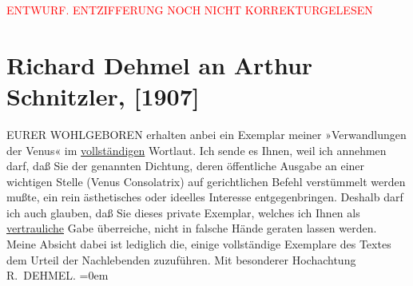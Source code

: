 
\begin{center}
            \textcolor{red}{ENTWURF. ENTZIFFERUNG NOCH NICHT KORREKTURGELESEN}
                      \end{center}
            
               \section[Richard Dehmel an Arthur Schnitzler, {[}1907{]}]{ Richard Dehmel an Arthur Schnitzler, {[}1907{]}}\nopagebreak{}\rehead{ }\begin{ledgroupsized}[t]{13cm}\normalsize\beginnumbering{} \toendnotes[C]{\smallbreak\pagebreak[2]} 
\pstart\center{}{\pb}EURER WOHLGEBOREN\pend\pstart
           erhalten anbei ein Exemplar meiner »Verwandlungen
                        der Venus« im \uline{vollständigen} Wortlaut.
                    Ich sende es Ihnen, weil ich annehmen darf, daß Sie der genannten Dichtung,
                    deren öffentliche Ausgabe an einer wichtigen Stelle (Venus Consolatrix) auf
                    gerichtlichen Befehl verstümmelt werden mußte, ein rein ästhetisches oder
                    ideelles Interesse entgegenbringen. Deshalb darf ich auch glauben, daß Sie
                    dieses private Exemplar, welches ich Ihnen als \uline{vertrauliche} Gabe überreiche, nicht in falsche Hände geraten lassen
                    werden. Meine Absicht dabei ist lediglich die, einige vollständige Exemplare des
                    Textes dem Urteil der Nachlebenden zuzuführen.\pend
           \pstart
           Mit besonderer Hochachtung{\\[\baselineskip]}\spacefill\mbox{R. DEHMEL.}\pend
           \leftskip=0em{}\endnumbering{}\end{ledgroupsized}  \newcommand{\dateiname}{L01647}\newcommand{\titel}{Richard Dehmel an Arthur Schnitzler, [1907]}\newcommand{\editorInnen}{Martin Anton Müller und Gerd-Hermann Susen}
      
